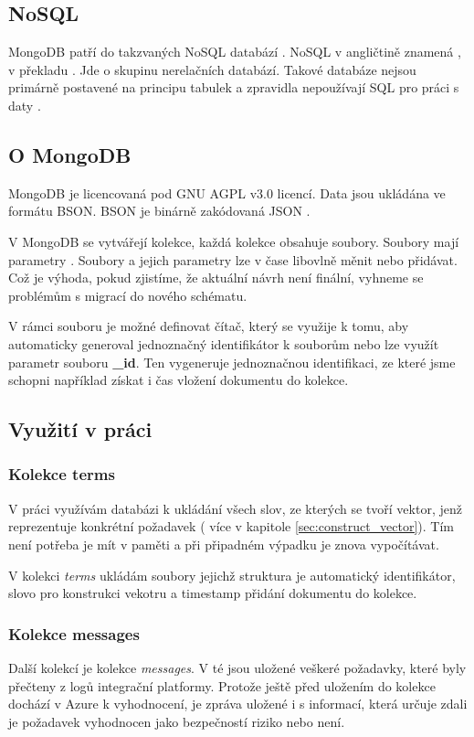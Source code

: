\documentclass[thesis=M,czech]{FITthesis}[2012/10/20]
\begin{document}
		\subsection{NoSQL}
			MongoDB patří do takzvaných NoSQL databází \cite{mongoDB}. NoSQL v angličtině znamená  \cite{Moniruzzaman_2013}, v překladu . Jde o skupinu nerelačních databází. Takové databáze nejsou primárně postavené na principu tabulek a zpravidla nepoužívají SQL pro práci s daty \cite{Moniruzzaman_2013}.
			
		\subsection{O MongoDB}
			MongoDB je licencovaná pod  GNU AGPL v3.0 \cite{mongo_gnu} licencí. Data jsou ukládána ve formátu BSON. BSON je binárně zakódovaná JSON \cite{bsonspec.org}.
			
			V MongoDB se vytvářejí kolekce, každá kolekce obsahuje soubory. Soubory mají parametry \cite{mongoDB}. Soubory a jejich parametry lze v čase libovlně měnit nebo přidávat. Což je výhoda, pokud zjistíme, že aktuální návrh není finální, vyhneme se problémům s migrací do nového schématu.
			
			V rámci souboru je možné definovat čítač, který se využije k tomu, aby automaticky generoval jednoznačný identifikátor k souborům nebo lze využít parametr souboru \textbf{\_id}. Ten vygeneruje jednoznačnou identifikaci, ze které jsme schopni například získat i čas vložení dokumentu do kolekce. 
			
		\subsection{Využití v práci}
			\subsubsection{Kolekce terms}
			V práci využívám databázi k ukládání všech slov, ze kterých se tvoří vektor, jenž reprezentuje konkrétní požadavek ( více v kapitole \ref{sec:construct_vector}). Tím není potřeba je mít v paměti a při připadném výpadku je znova vypočítávat.
			
			 V kolekci \textit{terms} ukládám soubory jejichž struktura je automatický identifikátor, slovo pro konstrukci vekotru a timestamp přidání dokumentu do kolekce.
			
			\subsubsection{Kolekce messages}
			Další kolekcí je kolekce \textit{messages}. V té jsou uložené veškeré požadavky, které byly přečteny z logů integrační platformy. Protože ještě před uložením do kolekce dochází v Azure k vyhodnocení, je zpráva uložené i s informací, která určuje zdali je požadavek vyhodnocen jako bezpečností riziko nebo není. 
			
\end{document}
